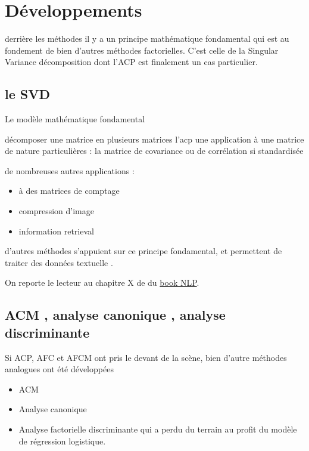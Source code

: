 \documentclass[
]{book}
\providecommand{\tightlist}{%
  \setlength{\itemsep}{0pt}\setlength{\parskip}{0pt}}
\begin{document}
\hypertarget{duxe9veloppements}{%
\section{Développements}\label{duxe9veloppements}}

derrière les méthodes il y a un principe mathématique fondamental qui est au fondement de bien d'autres méthodes factorielles. C'est celle de la Singular Variance décomposition dont l'ACP est finalement un cas particulier.

\hypertarget{le-svd}{%
\subsection{le SVD}\label{le-svd}}

Le modèle mathématique fondamental

décomposer une matrice en plusieurs matrices
l'acp une application à une matrice de nature particulières : la matrice de covariance ou de corrélation si standardisée

de nombreuses autres applications :

\begin{itemize}
\tightlist
\item
  à des matrices de comptage
\item
  compression d'image
\item
  information retrieval
\end{itemize}

d'autres méthodes s'appuient sur ce principe fondamental, et permettent de traiter des données textuelle .

On reporte le lecteur au chapitre X de du \href{https://benaventc.github.io/NLPBook/}{book NLP}.

\hypertarget{acm-analyse-canonique-analyse-discriminante}{%
\subsection{ACM , analyse canonique , analyse discriminante}\label{acm-analyse-canonique-analyse-discriminante}}

Si ACP, AFC et AFCM ont pris le devant de la scène, bien d'autre méthodes analogues ont été développées

\begin{itemize}
\tightlist
\item
  ACM
\item
  Analyse canonique
\item
  Analyse factorielle discriminante qui a perdu du terrain au profit du modèle de régression logistique.
\end{itemize}
\end{document}
